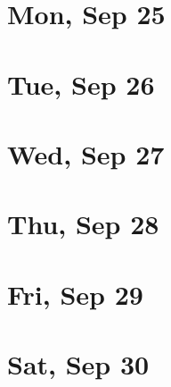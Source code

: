 	\section{Mon, Sep 25}
		
		
	\section{Tue, Sep 26}
		
		
	\section{Wed, Sep 27}
		
		
	\section{Thu, Sep 28}
		
		
	\section{Fri, Sep 29}
		
		
	\section{Sat, Sep 30}
		
		
